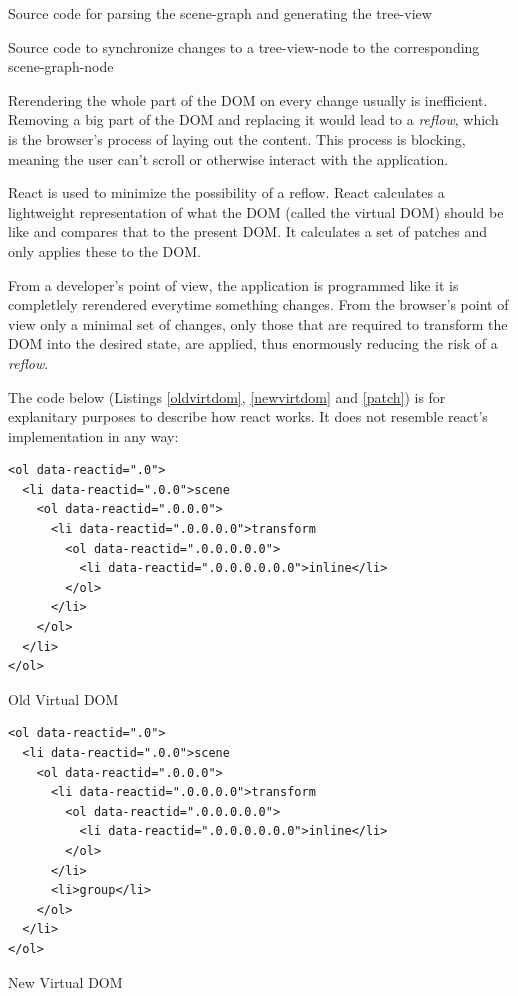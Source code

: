 \begin{enumerate*}
  \item Source code for parsing the scene-graph and generating the tree-view
  \item Source code to synchronize changes to a tree-view-node to the corresponding scene-graph-node
\end{enumerate*}

Rerendering the whole part of the \gls{DOM} on every change usually is inefficient. Removing a big part
of the \gls{DOM} and replacing it would lead to a \emph{reflow}, which is the browser's
process of laying out the content. This process is blocking, meaning the user can't
scroll or otherwise interact with the application. \cite{reflow}

React is used to minimize the possibility of a reflow. React
calculates a lightweight representation of what the \gls{DOM} (called the virtual DOM) should be like and
compares that to the present \gls{DOM}. It calculates a set of patches and
only applies these to the \gls{DOM}.

From a developer's point of view, the application is programmed like it is
completlely rerendered everytime something changes. From the browser's point
of view only a minimal set of changes, only those that are required to transform the
\gls{DOM} into the desired state, are applied, thus enormously reducing the risk of a \emph{reflow}.

The code below (Listings \ref{oldvirtdom}, \ref{newvirtdom} and \ref{patch}) is
for explanitary purposes to describe how react works. It does not resemble
react's implementation in any way:

\begin{listing}[H]
  \begin{verbatim}
<ol data-reactid=".0">
  <li data-reactid=".0.0">scene
    <ol data-reactid=".0.0.0">
      <li data-reactid=".0.0.0.0">transform
        <ol data-reactid=".0.0.0.0.0">
          <li data-reactid=".0.0.0.0.0.0">inline</li>
        </ol>
      </li>
    </ol>
  </li>
</ol>
  \end{verbatim}
  \caption{Old Virtual DOM}
  \label{oldvirtdom}
\end{listing}

\begin{listing}[H]
  \begin{verbatim}
<ol data-reactid=".0">
  <li data-reactid=".0.0">scene
    <ol data-reactid=".0.0.0">
      <li data-reactid=".0.0.0.0">transform
        <ol data-reactid=".0.0.0.0.0">
          <li data-reactid=".0.0.0.0.0.0">inline</li>
        </ol>
      </li>
      <li>group</li>
    </ol>
  </li>
</ol>
  \end{verbatim}
  \caption{New Virtual DOM}
  \label{newvirtdom}
\end{listing}

